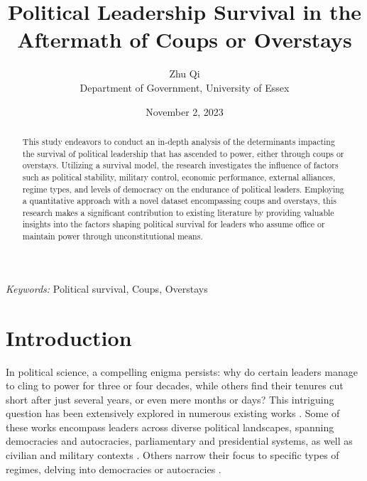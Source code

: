 \documentclass[
  12pt,
  a4paper,
  12pt]{article}
\begin{document}
\def\spacingset#1{\renewcommand{\baselinestretch}%
{#1}\small\normalsize} \spacingset{1}



\date{November 2, 2023}
\title{\bf Political Leadership Survival in the Aftermath of Coups or
Overstays}
\author{
Zhu Qi\\
Department of Government, University of Essex\\
}
\maketitle

\bigskip
\bigskip
\begin{abstract}
This study endeavors to conduct an in-depth analysis of the determinants
impacting the survival of political leadership that has ascended to
power, either through coups or overstays. Utilizing a survival model,
the research investigates the influence of factors such as political
stability, military control, economic performance, external alliances,
regime types, and levels of democracy on the endurance of political
leaders. Employing a quantitative approach with a novel dataset
encompassing coups and overstays, this research makes a significant
contribution to existing literature by providing valuable insights into
the factors shaping political survival for leaders who assume office or
maintain power through unconstitutional means.
\end{abstract}

\noindent%
{\it Keywords:} Political survival, Coups, Overstays
\vfill

\newpage
\spacingset{1.9} %
\ifdefined\Shaded\renewenvironment{Shaded}{\begin{tcolorbox}[sharp corners, frame hidden, borderline west={3pt}{0pt}{shadecolor}, boxrule=0pt, interior hidden, enhanced, breakable]}{\end{tcolorbox}}\fi

\hypertarget{introduction}{%
\section{Introduction}\label{introduction}}

In political science, a compelling enigma persists: why do certain
leaders manage to cling to power for three or four decades, while others
find their tenures cut short after just several years, or even mere
months or days? This intriguing question has been extensively explored
in numerous existing works
\citep[\citet{buenodemesquita2003}]{clinton1975politics}. Some of these
works encompass leaders across diverse political landscapes, spanning
democracies and autocracies, parliamentary and presidential systems, as
well as civilian and military contexts \citep{buenodemesquita2003}.
Others narrow their focus to specific types of regimes, delving into
democracies \citep{svolik2014} or autocracies \citep{davenport2021}.
\end{document}
